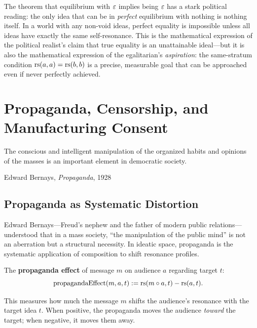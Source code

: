 \begin{interpretation}
The theorem that equilibrium with $\varepsilon$ implies being $\varepsilon$ has a stark
political reading: the only idea that can be in \emph{perfect} equilibrium with
nothing is nothing itself. In a world with any non-void ideas, perfect equality
is impossible unless all ideas have exactly the same self-resonance. This is the
mathematical expression of the political realist's claim that true equality is
an unattainable ideal---but it is also the mathematical expression of the
egalitarian's \emph{aspiration}: the same-stratum condition
$\mathrm{rs}(a,a) = \mathrm{rs}(b,b)$ is a precise, measurable goal that can be approached
even if never perfectly achieved.
\end{interpretation}


\chapter{Propaganda, Censorship, and Manufacturing Consent}
\label{ch:propaganda}

\epigraph{The conscious and intelligent manipulation of the organized habits and opinions of the masses is an important element in democratic society.}{Edward Bernays, \textit{Propaganda}, 1928}

\section{Propaganda as Systematic Distortion}

Edward Bernays---Freud's nephew and the father of modern public relations---
understood that in a mass society, ``the manipulation of the public mind'' is
not an aberration but a structural necessity. In ideatic space, propaganda is the
systematic application of composition to shift resonance profiles.

\begin{definition}
\label{def:propaganda}
The \textbf{propaganda effect} of message $m$ on audience $a$ regarding target $t$:
\[
  \mathrm{propagandaEffect}(m, a, t) := \mathrm{rs}(m \circ a, t) - \mathrm{rs}(a, t).
\]
\end{definition}

This measures how much the message $m$ shifts the audience's resonance with the
target idea $t$. When positive, the propaganda moves the audience \emph{toward}
the target; when negative, it moves them away.

